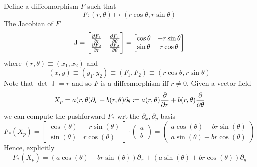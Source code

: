 \begin{example}
    Define a diffeomorphism \(F\) such that
    \begin{equation}
        F\colon (r, \theta) \mapsto (r \cos \theta, r \sin \theta)
    \end{equation}
    The Jacobian of \(F\)
    \begin{equation}
        \operatorname{J}
        =
        \begin{bmatrix}
            \pdv{F_1}{r} & \pdv{F_1}{\theta} \\
            \pdv{F_2}{r} & \pdv{F_2}{\theta}
        \end{bmatrix}
        =
        \begin{bmatrix}
            \cos \theta & -r \sin \theta \\
            \sin \theta & r \cos \theta
        \end{bmatrix}
    \end{equation}
    where \((r, \theta) \equiv (x_1, x_2)\) and
    \[
        (x, y) \equiv (y_1, y_2) \equiv (F_1, F_2) \equiv (r \cos \theta, r \sin \theta)
    \]
    Note that \(\det \operatorname{J} = r\) and so \(F\) is a diffeomorphism iff \(r \neq 0\).
    Given a vector field
    \begin{equation}
        X_p = a(r, \theta) \partial_r + b(r, \theta)\partial_\theta \coloneqq a(r, \theta) \pdv{}{r} + b(r, \theta)\pdv{}{\theta}
    \end{equation}
    we can compute the pushforward \(F_*\) wrt the \(\partial_x, \partial_y\) basis
    \begin{equation}
        F_* (X_p)
        =
        \begin{bmatrix}
            \cos (\theta) & -r \sin (\theta) \\
            \sin (\theta) & r \cos (\theta)
        \end{bmatrix}
        \cdot
        \begin{pmatrix}
            a \\ b
        \end{pmatrix}
        =
        \begin{pmatrix}
            a \cos (\theta) - br \sin (\theta) \\
            a\sin (\theta) + br \cos (\theta)
        \end{pmatrix}
    \end{equation}
    Hence, explicitly
    \begin{equation}
        F_* (X_p) = (a \cos (\theta) - br \sin (\theta))\partial_x + (a\sin (\theta) + br \cos (\theta))\partial_y
    \end{equation}


\end{example}

